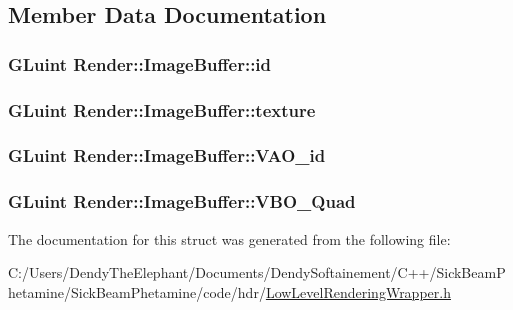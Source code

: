 \subsection{Member Data Documentation}
\subsubsection[{\texorpdfstring{id}{id}}]{\setlength{\rightskip}{0pt plus 5cm}G\+Luint Render\+::\+Image\+Buffer\+::id}\hypertarget{struct_render_1_1_image_buffer_a47f5f937bf7825fdcd4015a3fee19af7}{}\label{struct_render_1_1_image_buffer_a47f5f937bf7825fdcd4015a3fee19af7}
\subsubsection[{\texorpdfstring{texture}{texture}}]{\setlength{\rightskip}{0pt plus 5cm}G\+Luint Render\+::\+Image\+Buffer\+::texture}\hypertarget{struct_render_1_1_image_buffer_aee9977f1b19294be10824b796ead1c42}{}\label{struct_render_1_1_image_buffer_aee9977f1b19294be10824b796ead1c42}
\subsubsection[{\texorpdfstring{V\+A\+O\+\_\+id}{VAO_id}}]{\setlength{\rightskip}{0pt plus 5cm}G\+Luint Render\+::\+Image\+Buffer\+::\+V\+A\+O\+\_\+id}\hypertarget{struct_render_1_1_image_buffer_aca7c5ea5e5d4acece47d101675d50f4c}{}\label{struct_render_1_1_image_buffer_aca7c5ea5e5d4acece47d101675d50f4c}
\subsubsection[{\texorpdfstring{V\+B\+O\+\_\+\+Quad}{VBO_Quad}}]{\setlength{\rightskip}{0pt plus 5cm}G\+Luint Render\+::\+Image\+Buffer\+::\+V\+B\+O\+\_\+\+Quad}\hypertarget{struct_render_1_1_image_buffer_a2686e946f9d48ee451d628536a74afb6}{}\label{struct_render_1_1_image_buffer_a2686e946f9d48ee451d628536a74afb6}


The documentation for this struct was generated from the following file\+:\begin{DoxyCompactItemize}
\item 
C\+:/\+Users/\+Dendy\+The\+Elephant/\+Documents/\+Dendy\+Softainement/\+C++/\+Sick\+Beam\+Phetamine/\+Sick\+Beam\+Phetamine/code/hdr/\hyperlink{_low_level_rendering_wrapper_8h}{Low\+Level\+Rendering\+Wrapper.\+h}\end{DoxyCompactItemize}
